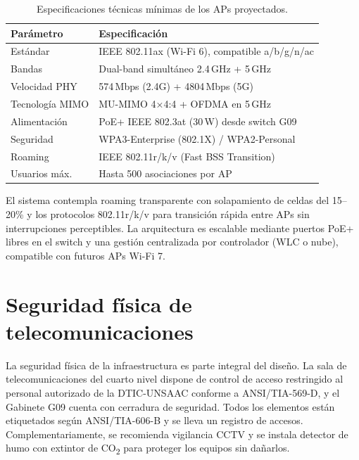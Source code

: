 \begin{table}[H]
    \centering
    \caption{Especificaciones técnicas mínimas de los APs proyectados.}
    \label{tab:specs_ap}
    \begin{tabular}{|p{4.5cm}|p{9cm}|}
        \hline
        \textbf{Parámetro} & \textbf{Especificación} \\
        \hline
        Estándar           & IEEE 802.11ax (Wi-Fi 6), compatible a/b/g/n/ac \\
        \hline
        Bandas             & Dual-band simultáneo 2.4\,GHz + 5\,GHz \\
        \hline
        Velocidad PHY      & 574\,Mbps (2.4G) + 4804\,Mbps (5G) \\
        \hline
        Tecnología MIMO    & MU-MIMO 4×4:4 + OFDMA en 5\,GHz \\
        \hline
        Alimentación       & PoE+ IEEE 802.3at (30\,W) desde switch G09 \\
        \hline
        Seguridad          & WPA3-Enterprise (802.1X) / WPA2-Personal \\
        \hline
        Roaming            & IEEE 802.11r/k/v (Fast BSS Transition) \\
        \hline
        Usuarios máx.      & Hasta 500 asociaciones por AP \\
        \hline
    \end{tabular}
\end{table}

El sistema contempla roaming transparente con solapamiento de celdas del 15--20\%
y los protocolos 802.11r/k/v para transición rápida entre APs sin interrupciones
perceptibles. La arquitectura es escalable mediante puertos PoE+ libres en el
switch y una gestión centralizada por controlador (WLC o nube), compatible con
futuros APs Wi-Fi 7.

\section{Seguridad física de telecomunicaciones}
\label{sec:seguridad_fisica}

La seguridad física de la infraestructura es parte integral del diseño. La sala
de telecomunicaciones del cuarto nivel dispone de control de acceso restringido
al personal autorizado de la DTIC-UNSAAC conforme a \mbox{ANSI/TIA-569-D}, y el
Gabinete G09 cuenta con cerradura de seguridad. Todos los elementos están
etiquetados según \mbox{ANSI/TIA-606-B} y se lleva un registro de accesos.
Complementariamente, se recomienda vigilancia CCTV y se instala detector de humo
con extintor de CO\textsubscript{2} para proteger los equipos sin dañarlos.
